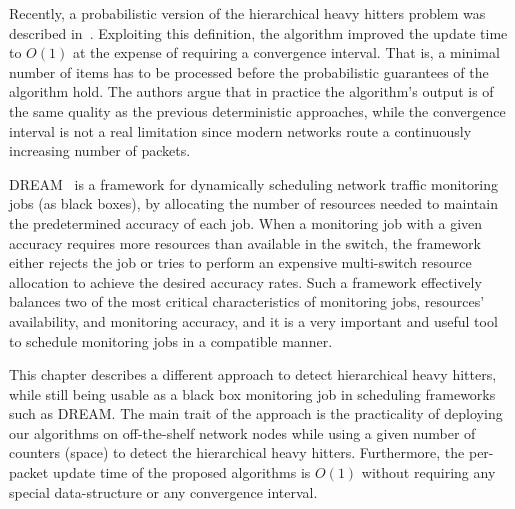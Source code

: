 Recently, a probabilistic version of the hierarchical heavy hitters problem was described in~\cite{ben2017constant}. Exploiting this definition, the algorithm improved the update time to $O(1)$ at the expense of requiring a convergence interval. That is, a minimal number of items has to be processed before the probabilistic guarantees of the algorithm hold. The authors argue that in practice the algorithm's output is of the same quality as the previous deterministic approaches, while the convergence interval is not a real limitation since modern networks route a continuously increasing number of packets.

DREAM~\cite{Moshref2014} is a framework for dynamically scheduling network traffic monitoring jobs (as black boxes), by allocating the number of resources needed to maintain the predetermined accuracy of each job. When a monitoring job with a given accuracy requires more resources than available in the switch, the framework either rejects the job or tries to perform an expensive multi-switch resource allocation to achieve the desired accuracy rates.
Such a framework effectively balances two of the most critical characteristics of monitoring jobs, resources' availability, and monitoring accuracy, and it is a very important and useful tool to schedule monitoring jobs in a compatible manner.

This chapter describes a different approach to detect hierarchical heavy hitters,
while still being usable as a black box monitoring job in scheduling frameworks such as DREAM. The main trait of the approach is the practicality of deploying our algorithms on off-the-shelf network nodes while using a given number of counters (space) to detect the hierarchical heavy hitters. Furthermore, the per-packet update time of the proposed algorithms is $O(1)$ without requiring any special data-structure or any convergence interval.